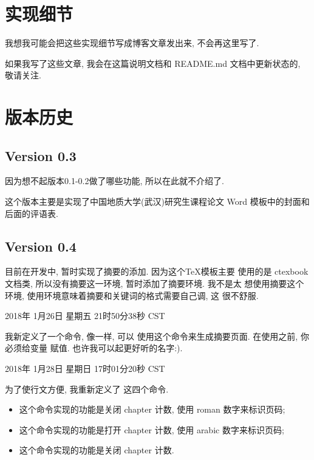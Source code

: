 \documentclass{cugrep}
\begin{document}
\chapter{实现细节}

我想我可能会把这些实现细节写成博客文章发出来, 不会再这里写了.

如果我写了这些文章, 我会在这篇说明文档和 README.md 文档中更新状态的, 敬请关注.
\chapter{版本历史}

\section{Version 0.3}
\label{sec:version_0_3}
因为想不起版本0.1-0.2做了哪些功能, 所以在此就不介绍了.

这个版本主要是实现了中国地质大学(武汉)研究生课程论文 Word 模板中的封面和后面的评语表.
\section{Version 0.4}
\label{sec:version_0_4}

目前在开发中, 暂时实现了摘要的添加. 因为这个\TeX{}模板主要 使用的是
ctexbook 文档类, 所以没有摘要这一环境, 暂时添加了摘要环境. 我不是太
想使用摘要这个环境, 使用环境意味着摘要和关键词的格式需要自己调, 这
很不舒服.

2018年 1月26日 星期五 21时50分38秒 CST

我新定义了一个命令, 像一样, 可以
使用这个命令来生成摘要页面. 在使用之前, 你必须给变量 赋值. 也许我可以起更好听的名字:).

2018年 1月28日 星期日 17时01分20秒 CST

为了使行文方便, 我重新定义了 这四个命令. 

\begin{itemize}
    \item {} 这个命令实现的功能是关闭 chapter 计数, 使用 roman 数字来标识页码;
    \item {} 这个命令实现的功能是打开 chapter 计数, 使用 arabic 数字来标识页码;
    \item {} 这个命令实现的功能是关闭 chapter 计数.
\end{itemize}
\end{document}
